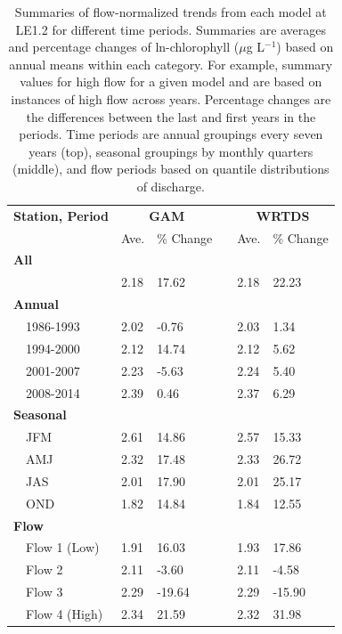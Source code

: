 \documentclass[letterpaper,12pt,oneside]{article}\usepackage[]{graphicx}\usepackage[]{color}
\newcommand{\mugl}{$\mu$g L$^{-1}$}
\begin{document}
\begin{table}[!tbp]
\caption{Summaries of flow-normalized trends from each model at LE1.2 for different time periods.  Summaries are averages and percentage changes of ln-chlorophyll (\mugl) based on annual means within each category.  For example, summary values for high flow for a given model and are based on instances of high flow across years.  Percentage changes are the differences between the last and first years in the periods.  Time periods are annual groupings every seven years (top), seasonal groupings by monthly quarters (middle), and flow periods based on quantile distributions of discharge.\label{tab:trendsLE12}} 
\begin{center}
\begin{tabular}{lllcll}
\hline\hline
\multicolumn{1}{l}{\bfseries Station, Period}&\multicolumn{2}{c}{\bfseries GAM}&\multicolumn{1}{c}{\bfseries }&\multicolumn{2}{c}{\bfseries WRTDS}\tabularnewline
\cline{2-3} \cline{5-6}
\multicolumn{1}{l}{}&\multicolumn{1}{c}{Ave.}&\multicolumn{1}{c}{\% Change}&\multicolumn{1}{c}{}&\multicolumn{1}{c}{Ave.}&\multicolumn{1}{c}{\% Change}\tabularnewline
\hline
{\bfseries All}&&&&&\tabularnewline
~~&2.18& 17.62&&2.18& 22.23\tabularnewline
\hline
{\bfseries Annual}&&&&&\tabularnewline
~~1986-1993&2.02& -0.76&&2.03&  1.34\tabularnewline
~~1994-2000&2.12& 14.74&&2.12&  5.62\tabularnewline
~~2001-2007&2.23& -5.63&&2.24&  5.40\tabularnewline
~~2008-2014&2.39&  0.46&&2.37&  6.29\tabularnewline
\hline
{\bfseries Seasonal}&&&&&\tabularnewline
~~JFM&2.61& 14.86&&2.57& 15.33\tabularnewline
~~AMJ&2.32& 17.48&&2.33& 26.72\tabularnewline
~~JAS&2.01& 17.90&&2.01& 25.17\tabularnewline
~~OND&1.82& 14.84&&1.84& 12.55\tabularnewline
\hline
{\bfseries Flow}&&&&&\tabularnewline
~~Flow 1 (Low)&1.91& 16.03&&1.93& 17.86\tabularnewline
~~Flow 2&2.11& -3.60&&2.11& -4.58\tabularnewline
~~Flow 3&2.29&-19.64&&2.29&-15.90\tabularnewline
~~Flow 4 (High)&2.34& 21.59&&2.32& 31.98\tabularnewline
\hline
\end{tabular}\end{center}

\end{table}
\end{document}
